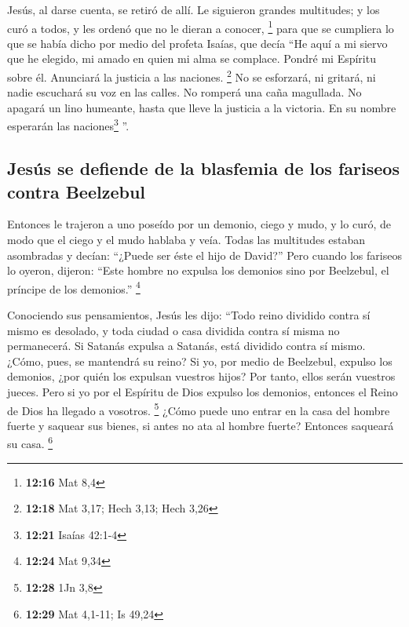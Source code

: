  Jesús, al darse cuenta, se retiró de allí. Le siguieron
grandes multitudes; y los curó a todos,  y les ordenó que
no le dieran a conocer, \footnote{\textbf{12:16} Mat 8,4}
 para que se cumpliera lo que se había dicho por medio
del profeta Isaías, que decía  ``He aquí a mi siervo que
he elegido, mi amado en quien mi alma se complace. Pondré mi Espíritu
sobre él. Anunciará la justicia a las naciones. \footnote{\textbf{12:18}
  Mat 3,17; Hech 3,13; Hech 3,26}  No se esforzará, ni
gritará, ni nadie escuchará su voz en las calles.  No
romperá una caña magullada. No apagará un lino humeante, hasta que lleve
la justicia a la victoria.  En su nombre esperarán las
naciones\footnote{\textbf{12:21} Isaías 42:1-4} ''.

\hypertarget{jesuxfas-se-defiende-de-la-blasfemia-de-los-fariseos-contra-beelzebul}{%
\subsection{Jesús se defiende de la blasfemia de los fariseos contra
Beelzebul}\label{jesuxfas-se-defiende-de-la-blasfemia-de-los-fariseos-contra-beelzebul}}

 Entonces le trajeron a uno poseído por un demonio, ciego
y mudo, y lo curó, de modo que el ciego y el mudo hablaba y veía.
 Todas las multitudes estaban asombradas y decían:
``¿Puede ser éste el hijo de David?''  Pero cuando los
fariseos lo oyeron, dijeron: ``Este hombre no expulsa los demonios sino
por Beelzebul, el príncipe de los demonios.'' \footnote{\textbf{12:24}
  Mat 9,34}

 Conociendo sus pensamientos, Jesús les dijo: ``Todo
reino dividido contra sí mismo es desolado, y toda ciudad o casa
dividida contra sí misma no permanecerá.  Si Satanás
expulsa a Satanás, está dividido contra sí mismo. ¿Cómo, pues, se
mantendrá su reino?  Si yo, por medio de Beelzebul,
expulso los demonios, ¿por quién los expulsan vuestros hijos? Por tanto,
ellos serán vuestros jueces.  Pero si yo por el Espíritu
de Dios expulso los demonios, entonces el Reino de Dios ha llegado a
vosotros. \footnote{\textbf{12:28} 1Jn 3,8}  ¿Cómo puede
uno entrar en la casa del hombre fuerte y saquear sus bienes, si antes
no ata al hombre fuerte? Entonces saqueará su casa. \footnote{\textbf{12:29}
  Mat 4,1-11; Is 49,24}

